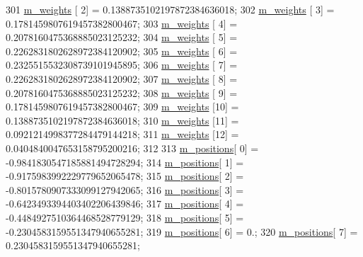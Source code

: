 \begin{DoxyCode}
301       \hyperlink{class_q_u_e_s_o_1_1_base1_d_quadrature_a7117fec020a8098d1c22b604268bad93}{m\_weights}  [ 2] =  0.1388735102197872384636018;
302       \hyperlink{class_q_u_e_s_o_1_1_base1_d_quadrature_a7117fec020a8098d1c22b604268bad93}{m\_weights}  [ 3] =  0.1781459807619457382800467;
303       \hyperlink{class_q_u_e_s_o_1_1_base1_d_quadrature_a7117fec020a8098d1c22b604268bad93}{m\_weights}  [ 4] =  0.2078160475368885023125232;
304       \hyperlink{class_q_u_e_s_o_1_1_base1_d_quadrature_a7117fec020a8098d1c22b604268bad93}{m\_weights}  [ 5] =  0.2262831802628972384120902;
305       \hyperlink{class_q_u_e_s_o_1_1_base1_d_quadrature_a7117fec020a8098d1c22b604268bad93}{m\_weights}  [ 6] =  0.2325515532308739101945895;
306       \hyperlink{class_q_u_e_s_o_1_1_base1_d_quadrature_a7117fec020a8098d1c22b604268bad93}{m\_weights}  [ 7] =  0.2262831802628972384120902;
307       \hyperlink{class_q_u_e_s_o_1_1_base1_d_quadrature_a7117fec020a8098d1c22b604268bad93}{m\_weights}  [ 8] =  0.2078160475368885023125232;
308       \hyperlink{class_q_u_e_s_o_1_1_base1_d_quadrature_a7117fec020a8098d1c22b604268bad93}{m\_weights}  [ 9] =  0.1781459807619457382800467;
309       \hyperlink{class_q_u_e_s_o_1_1_base1_d_quadrature_a7117fec020a8098d1c22b604268bad93}{m\_weights}  [10] =  0.1388735102197872384636018;
310       \hyperlink{class_q_u_e_s_o_1_1_base1_d_quadrature_a7117fec020a8098d1c22b604268bad93}{m\_weights}  [11] =  0.0921214998377284479144218;
311       \hyperlink{class_q_u_e_s_o_1_1_base1_d_quadrature_a7117fec020a8098d1c22b604268bad93}{m\_weights}  [12] =  0.0404840047653158795200216;
312 
313       \hyperlink{class_q_u_e_s_o_1_1_base1_d_quadrature_aeda387c028c3ba89ea0f9637a2234212}{m\_positions}[ 0] = -0.9841830547185881494728294;
314       \hyperlink{class_q_u_e_s_o_1_1_base1_d_quadrature_aeda387c028c3ba89ea0f9637a2234212}{m\_positions}[ 1] = -0.9175983992229779652065478;
315       \hyperlink{class_q_u_e_s_o_1_1_base1_d_quadrature_aeda387c028c3ba89ea0f9637a2234212}{m\_positions}[ 2] = -0.8015780907333099127942065;
316       \hyperlink{class_q_u_e_s_o_1_1_base1_d_quadrature_aeda387c028c3ba89ea0f9637a2234212}{m\_positions}[ 3] = -0.6423493394403402206439846;
317       \hyperlink{class_q_u_e_s_o_1_1_base1_d_quadrature_aeda387c028c3ba89ea0f9637a2234212}{m\_positions}[ 4] = -0.4484927510364468528779129;
318       \hyperlink{class_q_u_e_s_o_1_1_base1_d_quadrature_aeda387c028c3ba89ea0f9637a2234212}{m\_positions}[ 5] = -0.2304583159551347940655281;
319       \hyperlink{class_q_u_e_s_o_1_1_base1_d_quadrature_aeda387c028c3ba89ea0f9637a2234212}{m\_positions}[ 6] =  0.;
320       \hyperlink{class_q_u_e_s_o_1_1_base1_d_quadrature_aeda387c028c3ba89ea0f9637a2234212}{m\_positions}[ 7] =  0.2304583159551347940655281;

\end{DoxyCode}
